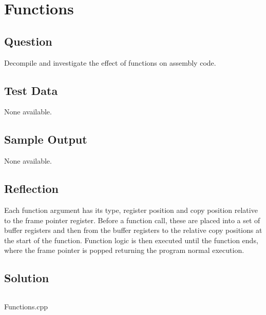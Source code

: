 \section{Functions}
    \subsection*{Question}
        Decompile and investigate the effect of functions on assembly code.
            
    \subsection*{Test Data}
        None available.
        
    \subsection*{Sample Output}
        None available.

    \subsection*{Reflection}
        Each function argument has its type, register position and copy position relative to the frame pointer register.
        Before a function call, these are placed into a set of buffer registers and then from the buffer registers
        to the relative copy positions at the start of the function. 
        Function logic is then executed until the function ends, where the frame pointer is popped
        returning the program normal execution.
        
    \subsection*{Solution}
        \begin{listing}[H]
            \inputminted[firstline=4, lastline=29]{cpp}{../Tasks/03-Functions/Functions.cpp}%
            \caption{Functions.cpp}
        \end{listing}